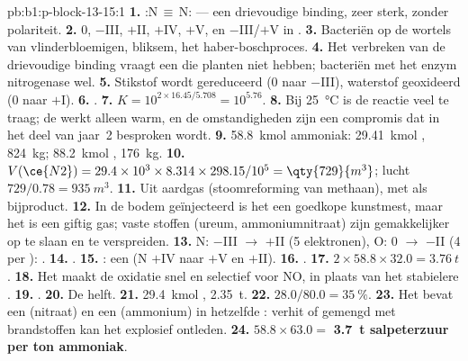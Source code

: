 \begin{solution}{pb:b1:p-block-13-15:1}
\textbf{1.} :N\,$\equiv$\,N: --- een drievoudige binding, zeer sterk, zonder
polariteit.
\textbf{2.} 0, $-$III, $+$II, $+$IV, $+$V, en $-$III/$+$V in .
\textbf{3.} Bacteriën op de wortels van vlinderbloemigen, bliksem, het
haber-boschproces.
\textbf{4.} Het verbreken van de drievoudige binding vraagt een
 die planten niet hebben; bacteriën met het enzym nitrogenase
wel.
\textbf{5.} Stikstof wordt gereduceerd (0 naar $-$III), waterstof
geoxideerd (0 naar $+$I).
\textbf{6.} .
\textbf{7.} $K = 10^{2 \times 16.45/5.708} = 10^{5.76}$.
\textbf{8.} Bij \qty{25}{\celsius} is de reactie veel te traag; de
 werkt alleen warm, en de omstandigheden zijn een compromis
dat in het deel van jaar~2 besproken wordt.
\textbf{9.} \qty{58.8}{kmol} ammoniak: \qty{29.41}{kmol} ,
\qty{824}{kg}; \qty{88.2}{kmol} , \qty{176}{kg}.
\textbf{10.} $V(\ce{N2}) = 29.4 \times 10^3 \times 8.314 \times 298.15/10^5 =
\qty{729}{m^3}$; lucht $729/0.78 = \qty{935}{m^3}$.
\textbf{11.} Uit aardgas (stoomreforming van methaan), met  als
bijproduct.
\textbf{12.} In de bodem geïnjecteerd is het een goedkope kunstmest, maar
het is een giftig gas; vaste stoffen (ureum, ammoniumnitraat) zijn
gemakkelijker op te slaan en te verspreiden.
\textbf{13.} N: $-$III $\to$ $+$II (5 elektronen), O: 0 $\to$ $-$II (4 per
): .
\textbf{14.} .
\textbf{15.} : een  (N
$+$IV naar $+$V en $+$II).
\textbf{16.} .
\textbf{17.} $2 \times 58.8 \times 32.0 = \qty{3.76}{t}$.
\textbf{18.} Het maakt de oxidatie snel en selectief voor NO, in plaats
van het stabielere .
\textbf{19.} .
\textbf{20.} De helft.
\textbf{21.} \qty{29.4}{kmol} , \qty{2.35}{t}.
\textbf{22.} $28.0/80.0 = \qty{35}{\percent}$.
\textbf{23.} Het bevat een  (nitraat) en een  (ammonium)
in hetzelfde : verhit of gemengd met brandstoffen kan het
explosief ontleden.
\textbf{24.} $58.8 \times 63.0 =$ \textbf{\qty{3.7}{t} salpeterzuur per ton
ammoniak}.
\end{solution}
